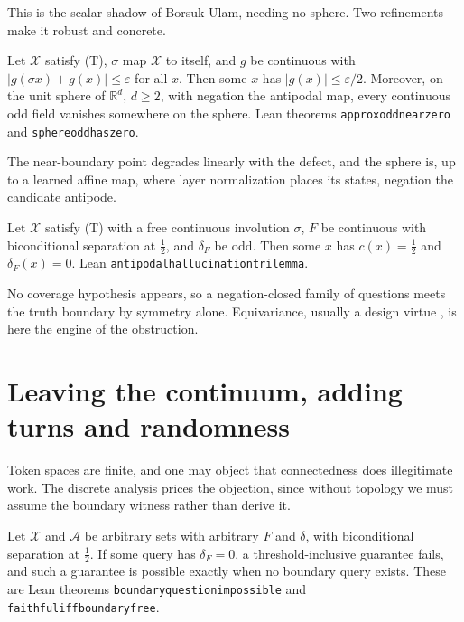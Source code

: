 \documentclass[mlmain,onecolumn]{jmlr}
\newcommand{\X}{\mathcal{X}}
\newcommand{\A}{\mathcal{A}}
\newcommand{\R}{\mathbb{R}}
\newcommand{\conf}{c}
\newcommand{\dF}{\delta_{\!F}}
\newcommand{\leanid}[1]{{\def\_{\textunderscore\allowbreak}\texttt{#1}}}
\begin{document}
This is the scalar shadow of Borsuk-Ulam, needing no sphere. Two
refinements make it robust and concrete.

\begin{theorem}
\label{thm:approx-odd}
Let $\X$ satisfy (T), $\sigma$ map $\X$ to itself, and $g$ be
continuous with $|g(\sigma x) + g(x)| \le \varepsilon$ for all $x$.
Then some $x$ has $|g(x)| \le \varepsilon/2$. Moreover, on the unit
sphere of $\R^d$, $d \ge 2$, with negation the antipodal map, every
continuous odd field vanishes somewhere on the sphere. Lean theorems
\leanid{approx\_odd\_near\_zero} and \leanid{sphere\_odd\_has\_zero}.
\end{theorem}

The near-boundary point degrades linearly with the defect, and the
sphere is, up to a learned affine map, where layer normalization
places its states, negation the candidate antipode.

\begin{theorem}
\label{thm:antipodal}
Let $\X$ satisfy (T) with a free continuous involution $\sigma$,
$F$ be continuous with biconditional separation at $\tfrac12$, and
$\dF$ be odd. Then some $x$ has $\conf(x) = \tfrac12$ and
$\dF(x) = 0$. Lean \leanid{antipodal\_hallucination\_trilemma}.
\end{theorem}

No coverage hypothesis appears, so a negation-closed family of
questions meets the truth boundary by symmetry alone. Equivariance,
usually a design virtue \citep{bronstein2021geometric}, is here the
engine of the obstruction.

\section{Leaving the continuum, adding turns and randomness}
\label{sec:discrete}
\label{sec:extensions}

Token spaces are finite, and one may object that connectedness does
illegitimate work. The discrete analysis prices the objection, since
without topology we must assume the boundary witness rather than
derive it.

\begin{theorem}
\label{thm:discrete}
Let $\X$ and $\A$ be arbitrary sets with arbitrary $F$ and
$\delta$, with biconditional separation at $\tfrac12$. If some query
has $\dF = 0$, a threshold-inclusive guarantee fails, and such a
guarantee is possible exactly when no boundary query exists. These
are Lean theorems
\leanid{boundary\_question\_impossible} and
\leanid{faithful\_iff\_boundary\_free}.
\end{theorem}
\end{document}
